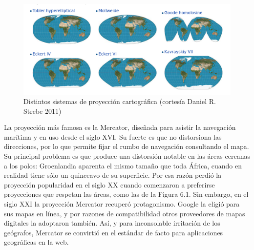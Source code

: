 \documentclass[spanish,]{book}
\begin{document}
\begin{figure}
\includegraphics[width=1\linewidth]{imagenes/proyecciones} \caption{Distintos sistemas de proyección cartográfica (cortesía Daniel R. Strebe 2011)}\label{fig:unnamed-chunk-143}
\end{figure}

La proyección más famosa es la Mercator, diseñada para asistir la navegación marítima y en uso desde el siglo XVI. Su fuerte es que no distorsiona las direcciones, por lo que permite fijar el rumbo de navegación consultando el mapa. Su principal problema es que produce una distorsión notable en las áreas cercanas a los polos: Groenlandia aparenta el mismo tamaño que toda África, cuando en realidad tiene sólo un quinceavo de su superficie. Por esa razón perdió la proyección popularidad en el siglo XX cuando comenzaron a preferirse proyecciones que respetan las áreas, como las de la Figura 6.1. Sin embargo, en el siglo XXI la proyección Mercator recuperó protagonismo. Google la eligió para sus mapas en línea, y por razones de compatibilidad otros proveedores de mapas digitales la adoptaron también. Así, y para inconsolable irritación de los geógrafos, Mercator se convirtió en el estándar de facto para aplicaciones geográficas en la web.
\end{document}
